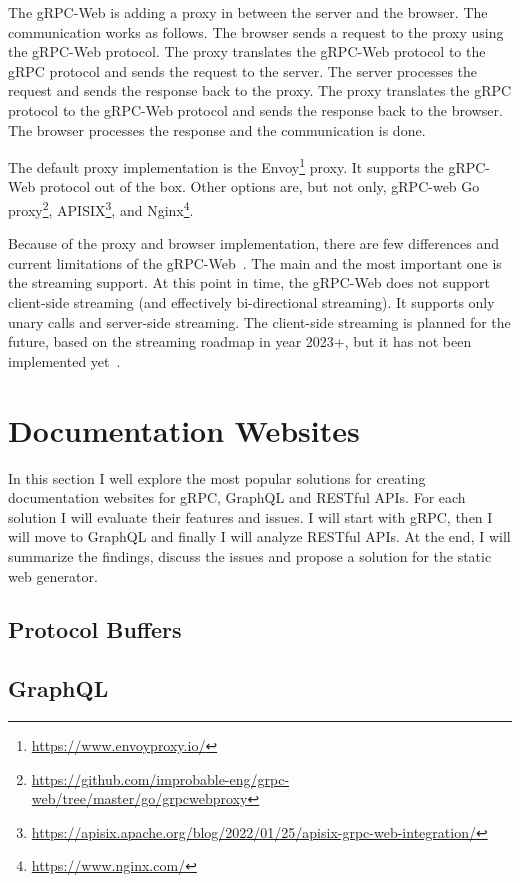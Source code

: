 The gRPC-Web is adding a proxy in between the server and the browser.
The communication works as follows.
The browser sends a request to the proxy using the gRPC-Web protocol.
The proxy translates the gRPC-Web protocol to the gRPC protocol and sends the request to the server.
The server processes the request and sends the response back to the proxy.
The proxy translates the gRPC protocol to the gRPC-Web protocol and sends the response back to the browser.
The browser processes the response and the communication is done.
\cite{grpc-protocol-web}

The default proxy implementation is the Envoy\footnote{\url{https://www.envoyproxy.io/}} proxy.
It supports the gRPC-Web protocol out of the box.
Other options are, but not only, gRPC-web Go proxy\footnote{\url{https://github.com/improbable-eng/grpc-web/tree/master/go/grpcwebproxy}}, APISIX\footnote{\url{https://apisix.apache.org/blog/2022/01/25/apisix-grpc-web-integration/}}, and Nginx\footnote{\url{https://www.nginx.com/}}.


Because of the proxy and browser implementation, there are few differences and current limitations of the gRPC-Web~\cite{grpc-web}.
The main and the most important one is the streaming support.
At this point in time, the gRPC-Web does not support client-side streaming (and effectively bi-directional streaming).
It supports only unary calls and server-side streaming.
The client-side streaming is planned for the future, based on the streaming roadmap in year 2023+, but it has not been implemented yet~\cite{grpc-web-streaming-roadmap}.


\section{Documentation Websites}
In this section I well explore the most popular solutions for creating documentation websites for gRPC, GraphQL and RESTful APIs.
For each solution I will evaluate their features and issues.
I will start with gRPC, then I will move to GraphQL and finally I will analyze RESTful APIs.
At the end, I will summarize the findings, discuss the issues and propose a solution for the static web generator.

\subsection{Protocol Buffers}

\subsection{GraphQL}

